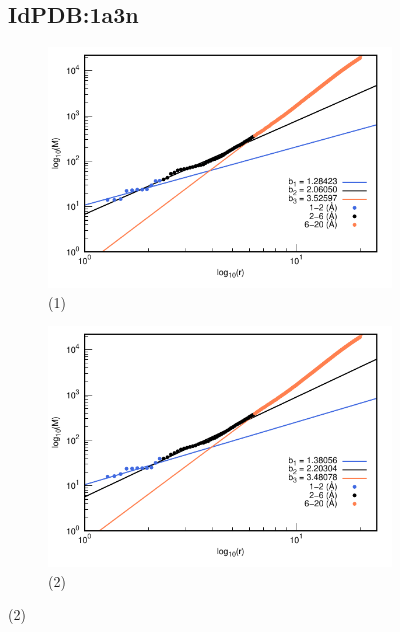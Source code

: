 		\begin{figure}[H]
			\subsection*{IdPDB:1a3n}
			
			\hspace{-0.3cm} 
			\begin{subfigure}{0.49\textwidth}
				\centering
				\includegraphics[width=\linewidth,page=1]{graphs/PDBs/1a3n/1a3naddH.pdf}
				\caption{(1)}
			\end{subfigure}
			\hspace{0.2cm}
			\begin{subfigure}{0.49\textwidth}
				\centering
				\includegraphics[width=\linewidth,page=1]{graphs/PDBs/1a3n/1a3nEm.pdf}
				\caption{(2)}
			\end{subfigure}
			

\end{figure}
